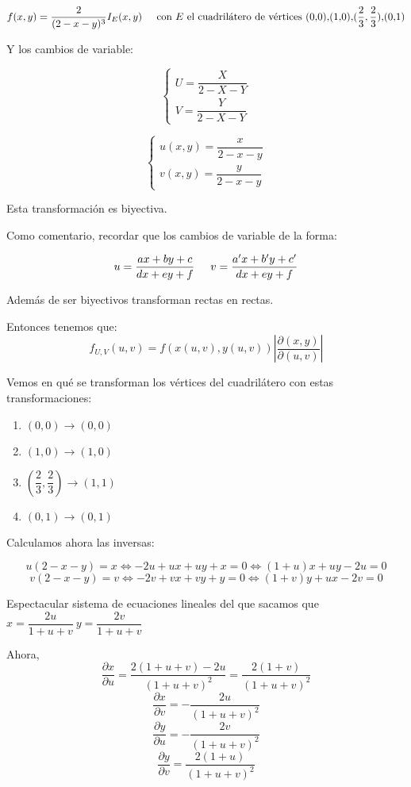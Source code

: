 \documentclass[openany]{book}
\begin{document}
\begin{exercise}
    $$ f(x,y) = \dfrac{2}{(2-x-y)^3}I_{E}(x,y)\hspace{5mm} \text{con $ E $ el cuadrilátero de vértices (0,0),(1,0),($ \dfrac{2}{3},\dfrac{2}{3} $),(0,1)} $$

    Y los cambios de variable:

    $$ \left\{
    \begin{array}{l}
        U = \dfrac{X}{2-X-Y}\\
        V = \dfrac{Y}{2-X-Y}
    \end{array}
    \right. $$

    $$ \left\{
    \begin{array}{l}
        u(x,y) = \dfrac{x}{2-x-y}\\
        v(x,y) = \dfrac{y}{2-x-y}
    \end{array}
    \right. $$

    Esta transformación es biyectiva.
    
    Como comentario, recordar que los cambios de variable de la forma:

    $$ u = \dfrac{ax+by+c}{dx+ey+f} \hspace{5mm} v = \dfrac{a'x+b'y+c'}{dx+ey+f} $$

    Además de ser biyectivos transforman rectas en rectas.

    Entonces tenemos que:
    $$ f_{U,V} (u,v) = f(x(u,v),y(u,v)) \left| \dfrac{\partial (x,y)}{\partial(u,v)} \right|$$

    Vemos en qué se transforman los vértices del cuadrilátero con estas transformaciones:
    \begin{enumerate}
        \item $ (0,0) \to (0,0) $
        \item $ (1,0) \to (1,0) $
        \item $ ( \dfrac{2}{3},\dfrac{2}{3}) \to (1,1)$
        \item $ (0,1) \to (0,1) $
    \end{enumerate}

    Calculamos ahora las inversas:

    $$ u(2-x-y) = x \iff -2u+ux+uy+x = 0 \iff (1+u)x+uy-2u = 0 $$
    $$ v(2-x-y) = v \iff -2v+vx+vy+y = 0 \iff (1+v)y+ux-2v = 0 $$

    Espectacular sistema de ecuaciones lineales del que sacamos que $ x = \dfrac{2u}{1+u+v}\ y = \dfrac{2v}{1+u+v} $

    Ahora,
    $$ \dfrac{\partial x}{\partial u} = \dfrac{2(1+u+v)-2u}{(1+u+v)^2} = \dfrac{2(1+v)}{(1+u+v)^2} $$
    $$ \dfrac{\partial x}{\partial v} = -\dfrac{2u}{(1+u+v)^2} $$
    $$ \dfrac{\partial y}{\partial u} = -\dfrac{2v}{(1+u+v)^2} $$
    $$ \dfrac{\partial y}{\partial v} = \dfrac{2(1+u)}{(1+u+v)^2} $$


\end{exercise}
\end{document}
